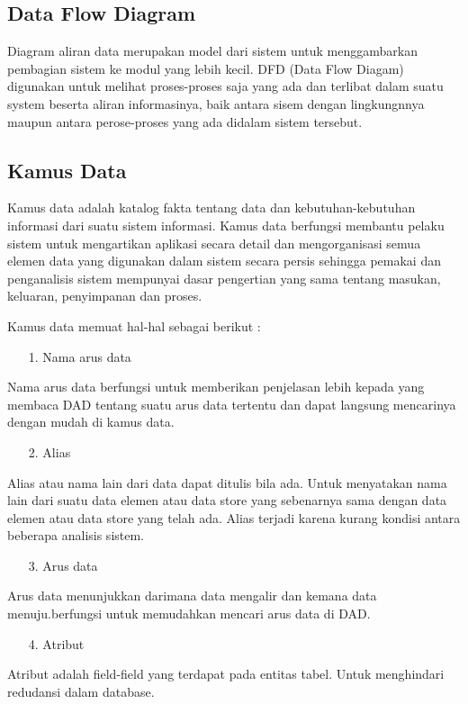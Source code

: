 \documentclass{jtetiproposalskripsi}
\begin{document}
\subsection{Data Flow Diagram}
Diagram aliran data merupakan model dari sistem untuk menggambarkan pembagian sistem ke modul yang lebih kecil. DFD (Data Flow Diagam) digunakan untuk melihat proses-proses saja yang ada dan terlibat dalam suatu system beserta aliran informasinya, baik antara sisem dengan lingkungnnya maupun antara perose-proses yang ada didalam sistem tersebut.

\subsection{Kamus Data}
Kamus data adalah katalog fakta tentang data dan kebutuhan-kebutuhan informasi dari suatu sistem informasi. Kamus data berfungsi membantu pelaku sistem untuk mengartikan aplikasi secara detail dan mengorganisasi semua elemen data yang digunakan dalam sistem secara persis sehingga pemakai dan penganalisis sistem mempunyai dasar pengertian yang sama tentang masukan, keluaran, penyimpanan dan proses.

Kamus data memuat hal-hal sebagai berikut :
\begin{itemize}
\item[1.] Nama arus data
\end{itemize}
Nama arus data berfungsi untuk memberikan penjelasan lebih kepada yang membaca DAD tentang suatu arus data tertentu dan dapat langsung mencarinya dengan mudah di kamus data.
\begin{itemize}
\item[2.] Alias
\end{itemize}
Alias atau nama lain dari data dapat ditulis bila ada. Untuk menyatakan nama lain dari suatu data elemen atau data store yang sebenarnya sama dengan data elemen atau data store yang telah ada. Alias terjadi karena kurang kondisi antara beberapa analisis sistem.
\begin{itemize}
\item[3.] Arus data
\end{itemize}
Arus data menunjukkan darimana data mengalir dan kemana data menuju.berfungsi untuk memudahkan mencari arus data di DAD.
\begin{itemize}
\item[4.] Atribut
\end{itemize}
Atribut adalah field-field yang terdapat pada entitas tabel. Untuk menghindari redudansi dalam database.
\end{document}
